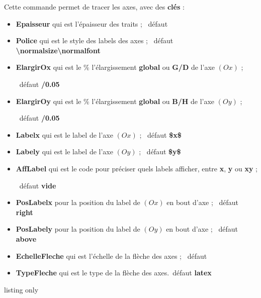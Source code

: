 \documentclass[a4paper,french,11pt]{article}
\newcommand\cmaj[1]{%
	{\tcbox[vignetteMaJ]{#1}\xspace}%
}
\newcommand\Cle[1]{{\bfseries\sffamily\textlangle #1\textrangle}}
\begin{document}
\begin{cautionblock}
Cette commande permet de tracer les axes, avec des \Cle{clés} :

\begin{itemize}
	\item \Cle{Epaisseur} qui est l'épaisseur des traits ; \hfill~défaut \Cle{1.25pt}
	\item \Cle{Police} qui est le style des labels des axes  ; \hfill~défaut \Cle{\textbackslash{}normalsize\textbackslash{}normalfont}
	\item \cmaj{2.1.2} \Cle{ElargirOx} qui est le \% l'élargissement \Cle{global} ou \Cle{G/D} de l'axe $(Ox)$ ;
	
	\hfill~défaut \Cle{0/0.05}
	\item \cmaj{2.1.2} \Cle{ElargirOy} qui est le \% l'élargissement \Cle{global} ou \Cle{B/H} de l'axe $(Oy)$ ;
	
	\hfill~défaut \Cle{0/0.05}
	\item \Cle{Labelx} qui est le label de l'axe $(Ox)$ ; \hfill~défaut \Cle{\${}x\$}
	\item \Cle{Labely} qui est le label de l'axe $(Oy)$ ; \hfill~défaut \Cle{\${}y\$}
	\item \Cle{AffLabel} qui est le code pour préciser quels labels afficher, entre \Cle{x}, \Cle{y} ou \Cle{xy} ;
	
	\hfill~défaut \Cle{vide}
	\item \Cle{PosLabelx} pour la position du label de $(Ox)$ en bout d'axe ; \hfill~défaut \Cle{right}
	\item \Cle{PosLabely} pour la position du label de $(Oy)$ en bout d'axe ; \hfill~défaut \Cle{above}
	\item \Cle{EchelleFleche} qui est l'échelle de la flèche des axes ; \hfill~défaut \Cle{1}
	\item \Cle{TypeFleche} qui est le type de la flèche des axes.\hfill~défaut \Cle{latex}
\end{itemize}
\vspace*{-\baselineskip}\leavevmode
\end{cautionblock}

\begin{PresCodeTexPL}{listing only}
	\AxesTikz

	\AxesTikz%
		[AffLabel=xy,Labelx={Année},Labely={Altitude},%
		PosLabelx={below right},PosLabely={above left},%
		Police=\small\sffamily]
\end{PresCodeTexPL}
\end{document}
